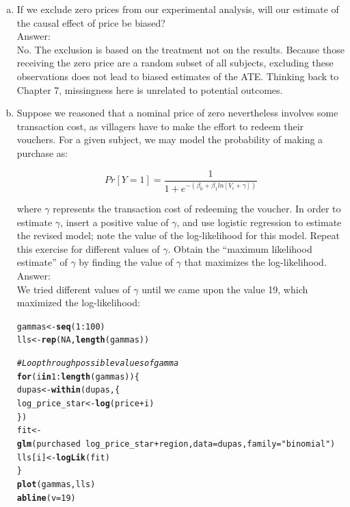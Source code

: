 \documentclass[11pt,notitlepage]{article}\usepackage[]{graphicx}\usepackage[]{color}
\makeatletter
\newcommand{\hlnum}[1]{\textcolor[rgb]{0.686,0.059,0.569}{#1}}%
\newcommand{\hlstr}[1]{\textcolor[rgb]{0.192,0.494,0.8}{#1}}%
\newcommand{\hlcom}[1]{\textcolor[rgb]{0.678,0.584,0.686}{\textit{#1}}}%
\newcommand{\hlopt}[1]{\textcolor[rgb]{0,0,0}{#1}}%
\newcommand{\hlstd}[1]{\textcolor[rgb]{0.345,0.345,0.345}{#1}}%
\newcommand{\hlkwa}[1]{\textcolor[rgb]{0.161,0.373,0.58}{\textbf{#1}}}%
\newcommand{\hlkwb}[1]{\textcolor[rgb]{0.69,0.353,0.396}{#1}}%
\newcommand{\hlkwc}[1]{\textcolor[rgb]{0.333,0.667,0.333}{#1}}%
\newcommand{\hlkwd}[1]{\textcolor[rgb]{0.737,0.353,0.396}{\textbf{#1}}}%
\newenvironment{kframe}{%
 \def\at@end@of@kframe{}%
 \ifinner\ifhmode%
  \def\at@end@of@kframe{\end{minipage}}%
  \begin{minipage}{\columnwidth}%
 \fi\fi%
 \def\FrameCommand##1{\hskip\@totalleftmargin \hskip-\fboxsep
 \colorbox{shadecolor}{##1}\hskip-\fboxsep
     \hskip-\linewidth \hskip-\@totalleftmargin \hskip\columnwidth}%
 \MakeFramed {\advance\hsize-\width
   \@totalleftmargin\z@ \linewidth\hsize
   \@setminipage}}%
 {\par\unskip\endMakeFramed%
 \at@end@of@kframe}
\newenvironment{knitrout}{}{} %
\makeatother
\begin{document}
\begin{enumerate}[a)]
\item If we exclude zero prices from our experimental analysis, will our estimate of the causal effect of price be biased?\\
Answer:\\
No. The exclusion is based on the treatment not on the results. Because those receiving the zero price are a random subset of all subjects, excluding these observations does not lead to biased estimates of the ATE. Thinking back to Chapter 7, missingness here is unrelated to potential outcomes.

\item Suppose we reasoned that a nominal price of zero nevertheless involves some transaction cost, as villagers have to make the effort to redeem their vouchers. For a given subject, we may model the probability of making a purchase as:

\begin{equation*}
Pr[Y=1] = \frac{1}{1 + e^{-(\beta_0+\beta_1 ln[V_i+\gamma])}}
\end{equation*}

where $\gamma$ represents the transaction cost of redeeming the voucher. In order to estimate $\gamma$, insert a positive value of $\gamma$, and use logistic regression to estimate the revised model; note the value of the log-likelihood for this model. Repeat this exercise for different values of $\gamma$. Obtain the ``maximum likelihood estimate'' of $\gamma$ by finding the value of $\gamma$ that maximizes the log-likelihood. \\
Answer:\\
We tried different values of $\gamma$ until we came upon the value 19, which maximized the log-likelihood:
\begin{knitrout}
\color{fgcolor}\begin{kframe}
\begin{alltt}
\hlstd{gammas} \hlkwb{<-} \hlkwd{seq}\hlstd{(}\hlnum{1}\hlopt{:}\hlnum{100}\hlstd{)}
\hlstd{lls} \hlkwb{<-} \hlkwd{rep}\hlstd{(}\hlnum{NA}\hlstd{,} \hlkwd{length}\hlstd{(gammas))}


\hlcom{# Loop through possible values of gamma}
\hlkwa{for}\hlstd{(i} \hlkwa{in} \hlnum{1}\hlopt{:}\hlkwd{length}\hlstd{(gammas))\{}
  \hlstd{dupas} \hlkwb{<-} \hlkwd{within}\hlstd{(dupas,\{}
    \hlstd{log_price_star} \hlkwb{<-} \hlkwd{log}\hlstd{(price}\hlopt{+}\hlstd{i)}
  \hlstd{\})}
  \hlstd{fit} \hlkwb{<-} \hlkwd{glm}\hlstd{(purchased} \hlopt{~} \hlstd{log_price_star} \hlopt{+} \hlstd{region,} \hlkwc{data} \hlstd{= dupas,} \hlkwc{family} \hlstd{=} \hlstr{"binomial"}\hlstd{)}
  \hlstd{lls[i]} \hlkwb{<-} \hlkwd{logLik}\hlstd{(fit)}
\hlstd{\}}
\hlkwd{plot}\hlstd{(gammas, lls)}
\hlkwd{abline}\hlstd{(}\hlkwc{v} \hlstd{=} \hlnum{19}\hlstd{)}


\end{alltt}
\end{kframe}
\end{knitrout}
\end{enumerate}
\end{document}
